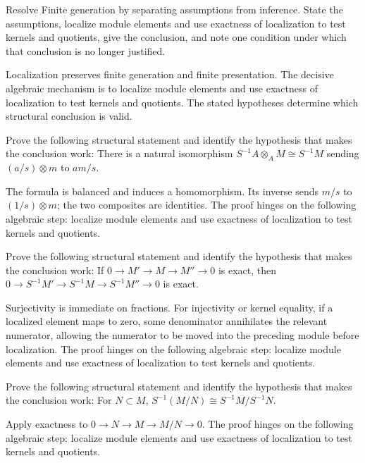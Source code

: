 \begin{problem}\label{prob:v07-problem-08}
Resolve Finite generation by separating assumptions from inference. State the assumptions, localize module elements and use exactness of localization to test kernels and quotients, give the conclusion, and note one condition under which that conclusion is no longer justified.
\end{problem}
\begin{solution}
Localization preserves finite generation and finite presentation. The decisive algebraic mechanism is to localize module elements and use exactness of localization to test kernels and quotients. The stated hypotheses determine which structural conclusion is valid.
\end{solution}

\begin{problem}\label{prob:v07-problem-09}
Prove the following structural statement and identify the hypothesis that makes the conclusion work: There is a natural isomorphism $S^{-1}A\otimes_A M\cong S^{-1}M$ sending $(a/s)\otimes m$ to $am/s$.
\end{problem}
\begin{solution}
The formula is balanced and induces a homomorphism. Its inverse sends $m/s$ to $(1/s)\otimes m$; the two composites are identities. The proof hinges on the following algebraic step: localize module elements and use exactness of localization to test kernels and quotients.
\end{solution}

\begin{problem}\label{prob:v07-problem-10}
Prove the following structural statement and identify the hypothesis that makes the conclusion work: If $0\to M'\to M\to M''\to0$ is exact, then $0\to S^{-1}M'\to S^{-1}M\to S^{-1}M''\to0$ is exact.
\end{problem}
\begin{solution}
Surjectivity is immediate on fractions. For injectivity or kernel equality, if a localized element maps to zero, some denominator annihilates the relevant numerator, allowing the numerator to be moved into the preceding module before localization. The proof hinges on the following algebraic step: localize module elements and use exactness of localization to test kernels and quotients.
\end{solution}

\begin{problem}\label{prob:v07-problem-11}
Prove the following structural statement and identify the hypothesis that makes the conclusion work: For $N\subset M$, $S^{-1}(M/N)\cong S^{-1}M/S^{-1}N$.
\end{problem}
\begin{solution}
Apply exactness to $0\to N\to M\to M/N\to0$. The proof hinges on the following algebraic step: localize module elements and use exactness of localization to test kernels and quotients.
\end{solution}


